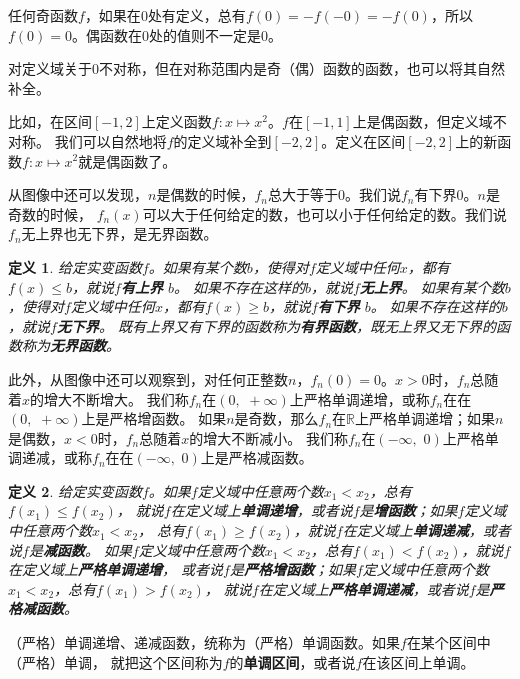 \documentclass[12pt,UTF8]{ctexbook}
\newtheorem{df}{定义}[section]
\begin{document}
任何奇函数$f$，如果在$0$处有定义，总有$f(0) = - f(-0) = - f(0)$，所以$f(0) = 0$。偶函数在$0$处的值则不一定是$0$。

对定义域关于$0$不对称，但在对称范围内是奇（偶）函数的函数，也可以将其自然补全。

比如，在区间$[-1,2]$上定义函数$f: x\mapsto x^2$。$f$在$[-1,1]$上是偶函数，但定义域不对称。
我们可以自然地将$f$的定义域补全到$[-2,2]$。定义在区间$[-2,2]$上的新函数$f: x\mapsto x^2$就是偶函数了。

从图像中还可以发现，$n$是偶数的时候，$f_n$总大于等于$0$。我们说$f_n$有下界$0$。$n$是奇数的时候，
$f_n(x)$可以大于任何给定的数，也可以小于任何给定的数。我们说$f_n$无上界也无下界，是无界函数。
\begin{df}
    给定实变函数$f$。如果有某个数$b$，使得对$f$定义域中任何$x$，都有$f(x)\leqslant b$，就说$f$\textbf{有上界} $b$。
    如果不存在这样的$b$，就说$f$\textbf{无上界}。
    如果有某个数$b$，使得对$f$定义域中任何$x$，都有$f(x)\geqslant b$，就说$f$\textbf{有下界} $b$。
    如果不存在这样的$b$，就说$f$\textbf{无下界}。
    既有上界又有下界的函数称为\textbf{有界函数}，既无上界又无下界的函数称为\textbf{无界函数}。
\end{df}

此外，从图像中还可以观察到，对任何正整数$n$，$f_n(0) = 0$。$x>0$时，$f_n$总随着$x$的增大不断增大。
我们称$f_n$在$(0, \,\, +\infty)$上严格单调递增，或称$f_n$在在$(0, \,\, +\infty)$上是严格增函数。
如果$n$是奇数，那么$f_n$在$\mathbb{R}$上严格单调递增；如果$n$是偶数，$x<0$时，$f_n$总随着$x$的增大不断减小。
我们称$f_n$在$(-\infty,\,\, 0)$上严格单调递减，或称$f_n$在在$(-\infty,\,\, 0)$上是严格减函数。
\begin{df}
    给定实变函数$f$。如果$f$定义域中任意两个数$x_1 < x_2$，总有$f(x_1) \leqslant f(x_2)$，
    就说$f$在定义域上\textbf{单调递增}，或者说$f$是\textbf{增函数}；如果$f$定义域中任意两个数$x_1 < x_2$，
    总有$f(x_1) \geqslant f(x_2)$，就说$f$在定义域上\textbf{单调递减}，或者说$f$是\textbf{减函数}。
    如果$f$定义域中任意两个数$x_1 < x_2$，总有$f(x_1) < f(x_2)$，就说$f$在定义域上\textbf{严格单调递增}，
    或者说$f$是\textbf{严格增函数}；如果$f$定义域中任意两个数$x_1 < x_2$，总有$f(x_1) > f(x_2)$，
    就说$f$在定义域上\textbf{严格单调递减}，或者说$f$是\textbf{严格减函数}。   
\end{df}

（严格）单调递增、递减函数，统称为（严格）单调函数。如果$f$在某个区间中（严格）单调，
就把这个区间称为$f$的\textbf{单调区间}，或者说$f$在该区间上单调。
\end{document}

